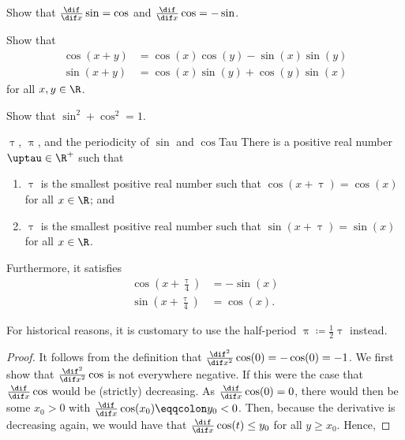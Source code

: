 \begin{exr}{}{}
Show that $\frac{\dif}{\dif x}\sin =\cos$ and $\frac{\dif}{\dif x}\cos =-\sin$.
\end{exr}
\begin{exr}{}{}
Show that
\begin{equation}
\begin{aligned}
\cos (x+y) & =\cos (x)\cos (y)-\sin (x)\sin (y) \\
\sin (x+y) & =\cos (x)\sin (y)+\cos (y)\sin (x)
\end{aligned}
\end{equation}
for all $x,y\in \R$.
\end{exr}
\begin{exr}[breakable=false]{}{}
Show that $\sin ^2+\cos ^2=1$.
\end{exr}
\begin{prp}{$\uptau$, $\uppi$, and the periodicity of $\sin$ and $\cos$}{Tau}
There is a positive real number $\uptau \in \R ^+$\index[notation]{$\uptau$} such that
\begin{enumerate}
\item $\uptau$ is the smallest positive real number such that $\cos (x+\uptau )=\cos (x)$ for all $x\in \R$; and
\item $\uptau$ is the smallest positive real number such that $\sin (x+\uptau )=\sin (x)$ for all $x\in \R$.
\end{enumerate}
Furthermore, it satisfies
\begin{equation}
\begin{aligned}
\cos \left( x+\tfrac{\uptau}{4}\right) & =-\sin (x) \\
\sin \left( x+\tfrac{\uptau}{4}\right) & =\cos (x).
\end{aligned}
\end{equation}
\begin{rmk}
For historical reasons, it is customary to use the half-period $\uppi \coloneqq \frac{1}{2}\uptau$\index[notation]{$\uppi$} instead.
\end{rmk}
\begin{proof}
It follows from the definition that $\frac{\dif ^2}{\dif x^2}\cos (0)=-\cos (0)=-1$.  We first show that $\frac{\dif ^2}{\dif x^2}\cos$ is not everywhere negative.  If this were the case that $\frac{\dif}{\dif x}\cos$ would be (strictly) decreasing.  As $\frac{\dif}{\dif x}\cos (0)=0$, there would then be some $x_0>0$ with $\frac{\dif}{\dif x}\cos (x_0)\eqqcolon y_0<0$.  Then, because the derivative is decreasing again, we would have that $\frac{\dif}{\dif x}\cos (t)\leq y_0$ for all $y\geq x_0$.  Hence,

\end{proof}
\end{prp}
